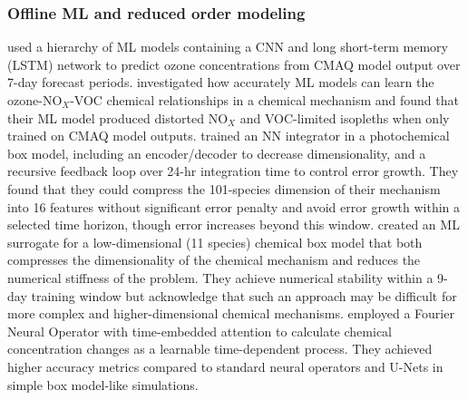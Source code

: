 \documentclass[gmd, manuscript]{copernicus}
\begin{document}
\subsubsection{Offline ML and reduced order modeling}
\citet{Xing2020} used a hierarchy of ML models containing a CNN and long short-term memory (LSTM) network to predict ozone concentrations from CMAQ model output over 7-day forecast periods. \citet{kuo_ozone_2023} investigated how accurately ML models can learn the ozone-NO$_X$-VOC chemical relationships in a chemical mechanism and found that their ML model produced distorted NO$_X$ and VOC-limited isopleths when only trained on CMAQ model outputs. \citet{kelp_toward_2020} trained an NN integrator in a photochemical box model, including an encoder/decoder to decrease dimensionality, and a recursive feedback loop over 24-hr integration time to control error growth. They found that they could compress the 101-species dimension of their mechanism into 16 features without significant error penalty and avoid error growth within a selected time horizon, though error increases beyond this window. \citet{yang_atmospheric_2024} created an ML surrogate for a low-dimensional (11 species) chemical box model that both compresses the dimensionality of the chemical mechanism and reduces the numerical stiffness of the problem. They achieve numerical stability within a 9-day training window but acknowledge that such an approach may be difficult for more complex and higher-dimensional chemical mechanisms. \citet{liu_neural_2024} employed a Fourier Neural Operator with time-embedded attention to calculate chemical concentration changes as a learnable time-dependent process. They achieved higher accuracy metrics compared to standard neural operators and U-Nets in simple box model-like simulations. 
\end{document}
